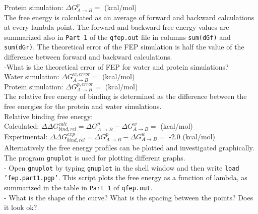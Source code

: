 \documentclass[a4paper,12pt]{article}
\begin{document}
Protein simulation: $\Delta G_{A \rightarrow B}^p=$ \hspace{2cm}(kcal/mol)\\

The free energy is calculated as an average of forward and backward calculations
at every lambda point. The forward and backward free energy values are summarized
also in \texttt{Part 1} of the \texttt{qfep.out} file in columns \texttt{sum(dGf)}
and \texttt{sum(dGr)}. The theoretical error of the FEP simulation is half the value of
the difference between forward and backward calculations.\\

-What is the theoretical error of FEP for water and protein simulations?\\

Water simulation: $\Delta G_{A \rightarrow B}^{w,error}=$ \hspace{2cm} (kcal/mol)\\

Protein simulation: $\Delta G_{A \rightarrow B}^{p,error}=$ \hspace{2cm}(kcal/mol)\\

The relative free energy of binding is determined as the difference between the
free energies for the protein and water simulations.\\

Relative binding free energy:\\

Calculated: $\Delta \Delta G_{bind,rel}^{calc} = \Delta G_{A \rightarrow B}^p-\Delta G_{A \rightarrow B}^w=$\hspace{1cm} (kcal/mol)\\

Experimental: $\Delta \Delta G_{bind,rel}^{exp} = \Delta G_{A \rightarrow B}^p-\Delta G_{A \rightarrow B}^w=$ -2.0 (kcal/mol)\\

Alternatively the free energy profiles can be plotted and investigated
graphically. The program \texttt{gnuplot} is used for plotting different graphs.\\

- Open \texttt{gnuplot} by typing \texttt{gnuplot} in the shell
window and then write \texttt{load 'fep.part1.pgp'}. This script
plots the free energy as a function of lambda, as summarized in
the table in \texttt{Part 1} of \texttt{qfep.out}.\\

- What is the shape of the curve? What is the spacing between the
points? Does it look ok?\\
\end{document}
